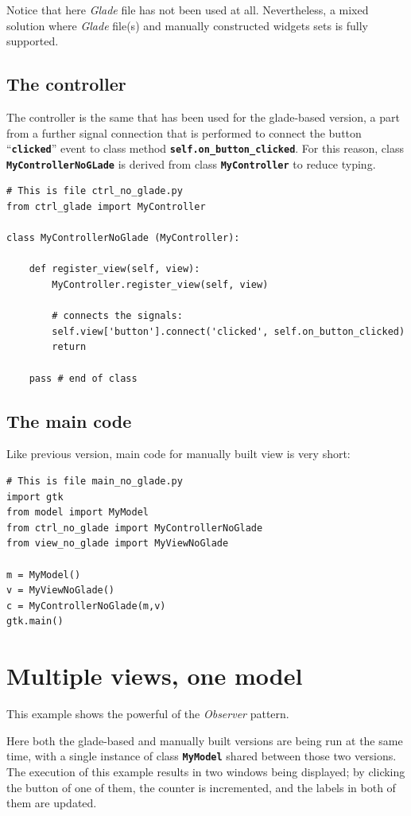 \documentclass{article}
\newcommand{\kw}[1]{\emph{#1}\xspace}
\newcommand{\appl}[1]{\textsl{#1}\xspace}
\newcommand{\glade}{\appl{Glade}}
\newcommand{\obs}{\kw{Observer} pattern\xspace}
\newcommand{\codename}[1]{\texttt{\bfseries \textcolor {codecolor}{#1}}\xspace}
\newcommand{\codesize}{\small } %
\begin{document}
Notice that here \glade file has not been used at all. Nevertheless, a
mixed solution where \glade file(s) and manually constructed widgets
sets is fully supported.


\subsection{The controller}
The controller is the same that has been used for the glade-based
version, a part from a further signal connection that is performed to
connect the button ``\codename{clicked}'' event to class method
\codename{self.on\_button\_clicked}. For this reason, class
\codename{MyControllerNoGLade} is derived from class
\codename{MyController} to reduce typing.
 
{ \codesize 
\begin{verbatim}   
# This is file ctrl_no_glade.py
from ctrl_glade import MyController

class MyControllerNoGlade (MyController):

    def register_view(self, view):
        MyController.register_view(self, view)

        # connects the signals:
        self.view['button'].connect('clicked', self.on_button_clicked)
        return    
    
    pass # end of class
\end{verbatim}
} 


\subsection{The main code}
Like previous version, main code for manually built view is very
short:

{ \codesize 
\begin{verbatim}     
# This is file main_no_glade.py
import gtk
from model import MyModel
from ctrl_no_glade import MyControllerNoGlade
from view_no_glade import MyViewNoGlade

m = MyModel()
v = MyViewNoGlade()
c = MyControllerNoGlade(m,v)
gtk.main()
\end{verbatim}
} 

\section{Multiple views, one model}
This example shows the powerful of the \obs.

Here both the glade-based and manually built versions are being run at
the same time, with a single instance of class \codename{MyModel}
shared between those two versions. The execution of this example
results in two windows being displayed; by clicking the button of one
of them, the counter is incremented, and the labels in both of them
are updated.
\end{document}
